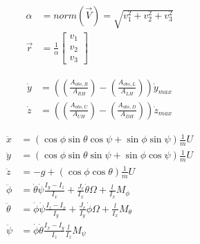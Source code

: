 \begin{subequations}
\label{eq:rodriguesVec}
\begin{align}
\alpha &= norm(\overrightarrow{V}) = \sqrt{v_1^2 + v_2^2 + v_3^2} \\
\overrightarrow{r} &= \frac{1}{\alpha} \begin{bmatrix} v_1 \\ v_2 \\ v_3 \end{bmatrix}
\end{align}
\end{subequations}


\begin{subequations}
\label{eq:avoid_guidance}
\begin{align}
\dot y &= ((\frac{A_{obs,R}}{A_{RH}})-(\frac{A_{obs,L}}{A_{LH}}))\dot y_{max} \\
\dot z &= ((\frac{A_{obs,U}}{A_{UH}})-(\frac{A_{obs,D}}{A_{DH}}))\dot z_{max}
\end{align}
\end{subequations}



\begin{subequations}
\label{eq:dynamic_model}
\begin{align}
\ddot{x} &= (\cos{\phi}\sin{\theta}\cos{\psi}+\sin{\phi}\sin{\psi})\frac{1}{m}U \\
\ddot{y} &= (\cos{\phi}\sin{\theta}\sin{\psi}+\sin{\phi}\cos{\psi})\frac{1}{m}U \\
\ddot{z} &= -g + (\cos{\phi}\cos{\theta})\frac{1}{m}U \\
\ddot\phi &= \dot\theta\dot\psi\frac{I_y-I_z}{I_x} + \frac{J_r}{I_x}\dot\theta\Omega + \frac{l}{I_x}M_{\phi} \\
\ddot\theta &= \dot\phi\dot\psi\frac{I_z-I_x}{I_y} + \frac{J_r}{I_y}\dot\phi\Omega + \frac{l}{I_x}M_{\theta} \\
\ddot\psi &= \dot\phi\dot\theta\frac{I_x-I_y}{I_z} \frac{l}{I_z}M_{\psi}
\end{align}
\end{subequations}